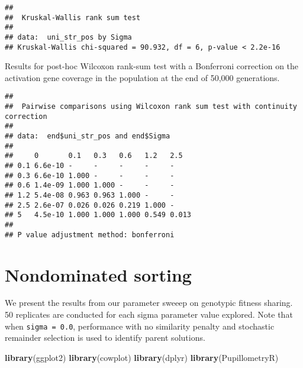 \documentclass[]{book}
\newenvironment{Shaded}{\begin{snugshade}}{\end{snugshade}}
\newcommand{\DataTypeTok}[1]{\textcolor[rgb]{0.13,0.29,0.53}{#1}}
\newcommand{\KeywordTok}[1]{\textcolor[rgb]{0.13,0.29,0.53}{\textbf{#1}}}
\newcommand{\NormalTok}[1]{#1}
\newcommand{\OperatorTok}[1]{\textcolor[rgb]{0.81,0.36,0.00}{\textbf{#1}}}
\newcommand{\OtherTok}[1]{\textcolor[rgb]{0.56,0.35,0.01}{#1}}
\newcommand{\StringTok}[1]{\textcolor[rgb]{0.31,0.60,0.02}{#1}}
\begin{document}
\begin{verbatim}
## 
##  Kruskal-Wallis rank sum test
## 
## data:  uni_str_pos by Sigma
## Kruskal-Wallis chi-squared = 90.932, df = 6, p-value < 2.2e-16
\end{verbatim}

Results for post-hoc Wilcoxon rank-sum test with a Bonferroni correction on the activation gene coverage in the population at the end of 50,000 generations.

\begin{Shaded}
\end{Shaded}

\begin{verbatim}
## 
##  Pairwise comparisons using Wilcoxon rank sum test with continuity correction 
## 
## data:  end$uni_str_pos and end$Sigma 
## 
##     0       0.1   0.3   0.6   1.2   2.5  
## 0.1 6.6e-10 -     -     -     -     -    
## 0.3 6.6e-10 1.000 -     -     -     -    
## 0.6 1.4e-09 1.000 1.000 -     -     -    
## 1.2 5.4e-08 0.963 0.963 1.000 -     -    
## 2.5 2.6e-07 0.026 0.026 0.219 1.000 -    
## 5   4.5e-10 1.000 1.000 1.000 0.549 0.013
## 
## P value adjustment method: bonferroni
\end{verbatim}

\hypertarget{nondominated-sorting}{%
\chapter{Nondominated sorting}\label{nondominated-sorting}}

We present the results from our parameter sweeep on genotypic fitness sharing.
50 replicates are conducted for each sigma parameter value explored.
Note that when \texttt{sigma\ =\ 0.0}, performance with no similarity penalty and stochastic remainder selection is used to identify parent solutions.

\begin{Shaded}
\begin{Highlighting}[]
\KeywordTok{library}\NormalTok{(ggplot2)}
\KeywordTok{library}\NormalTok{(cowplot)}
\KeywordTok{library}\NormalTok{(dplyr)}
\KeywordTok{library}\NormalTok{(PupillometryR)}
\end{Highlighting}
\end{Shaded}
\end{document}
